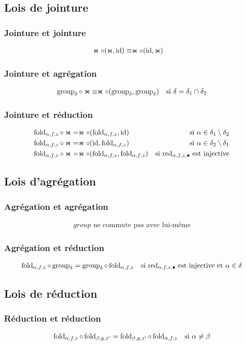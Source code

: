 \subsection*{Lois de jointure}
\subsubsection*{Jointure et jointure}
\begin{align*}
\Join \circ (\Join, \operatorname{id})
& \equiv \Join \circ (\operatorname{id}, \Join) &
\end{align*}

\subsubsection*{Jointure et agrégation}
\args
\begin{align*}
\operatorname{group}_{\delta} \circ \Join
& \equiv \Join \circ (\operatorname{group}_{\delta}, \operatorname{group}_{\delta})
& \text{si $\delta = \delta_1 \cap \delta_2$}
\end{align*}

\subsubsection*{Jointure et réduction}
\args
\begin{align*}
\operatorname{fold}_{\alpha, f, z} \circ \Join
& = \Join \circ (\operatorname{fold}_{\alpha, f, z}, \operatorname{id})
& \text{si $\alpha \in \delta_1 \setminus \delta_2$} \\
\operatorname{fold}_{\alpha, f, z} \circ \Join
& = \Join \circ (\operatorname{id}, \operatorname{fold}_{\alpha, f, z})
& \text{si $\alpha \in \delta_2 \setminus \delta_1$} \\
\operatorname{fold}_{\alpha, f, z} \circ \Join
& = \Join \circ (\operatorname{fold}_{\alpha, f, z}, \operatorname{fold}_{\alpha, f, z})
& \text{si $\operatorname{red}_{\alpha, f, z, \bullet}$ est injective}
\end{align*}

\subsection*{Lois d'agrégation}
\subsubsection*{Agrégation et agrégation}
\begin{align*}
\text{$group$ ne commute pas avec lui-même}
\end{align*}

\subsubsection*{Agrégation et réduction}
\begin{align*}
\operatorname{fold}_{\alpha, f, z} \circ \operatorname{group}_{\delta}
& = \operatorname{group}_{\delta} \circ \operatorname{fold}_{\alpha, f, z}
& \text{si $\operatorname{red}_{\alpha, f, z, \bullet}$ est injective et $\alpha \in \delta$}
\end{align*}

\subsection*{Lois de réduction}
\subsubsection*{Réduction et réduction}
\begin{align*}
\operatorname{fold}_{\alpha, f, z} \circ \operatorname{fold}_{\beta, g, z'}
& = \operatorname{fold}_{\beta, g, z'} \circ \operatorname{fold}_{\alpha, f, z}
& \text{si $\alpha \neq \beta$}
\end{align*}